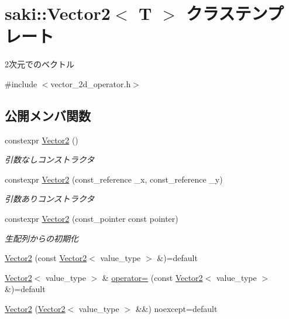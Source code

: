 \hypertarget{classsaki_1_1_vector2}{}\section{saki\+:\+:Vector2$<$ T $>$ クラステンプレート}
\label{classsaki_1_1_vector2}


2次元でのベクトル  




{\ttfamily \#include $<$vector\+\_\+2d\+\_\+operator.\+h$>$}

\subsection*{公開メンバ関数}
\begin{DoxyCompactItemize}
\item 
constexpr \mbox{\hyperlink{classsaki_1_1_vector2_af57b72f4255812a361bef1922a226f86}{Vector2}} ()
\begin{DoxyCompactList}\small\item\em 引数なしコンストラクタ \end{DoxyCompactList}\item 
constexpr \mbox{\hyperlink{classsaki_1_1_vector2_abb15c5d7f0a663f4c6b179012bd942b4}{Vector2}} (const\+\_\+reference \+\_\+x, const\+\_\+reference \+\_\+y)
\begin{DoxyCompactList}\small\item\em 引数ありコンストラクタ \end{DoxyCompactList}\item 
constexpr \mbox{\hyperlink{classsaki_1_1_vector2_ac15263f1583a51e451b5089058fca60e}{Vector2}} (const\+\_\+pointer const pointer)
\begin{DoxyCompactList}\small\item\em 生配列からの初期化 \end{DoxyCompactList}\item 
\mbox{\hyperlink{classsaki_1_1_vector2_a4b18314464e9f80aa053af5309fe4d6b}{Vector2}} (const \mbox{\hyperlink{classsaki_1_1_vector2}{Vector2}}$<$ value\+\_\+type $>$ \&)=default
\item 
\mbox{\hyperlink{classsaki_1_1_vector2}{Vector2}}$<$ value\+\_\+type $>$ \& \mbox{\hyperlink{classsaki_1_1_vector2_aaddfbeb26d405cf30e5bd31d6d4ebb62}{operator=}} (const \mbox{\hyperlink{classsaki_1_1_vector2}{Vector2}}$<$ value\+\_\+type $>$ \&)=default
\item 
\mbox{\hyperlink{classsaki_1_1_vector2_abaf03250171e9f2b18aa02aae22b6491}{Vector2}} (\mbox{\hyperlink{classsaki_1_1_vector2}{Vector2}}$<$ value\+\_\+type $>$ \&\&) noexcept=default

\end{DoxyCompactItemize}
